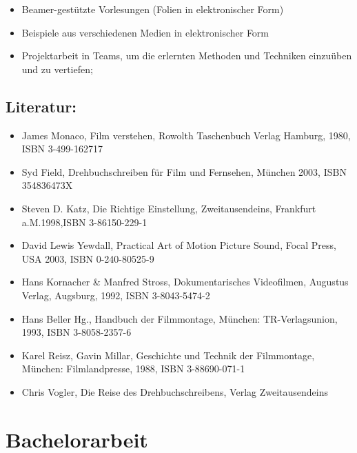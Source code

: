 \begin{itemize}
\item
  Beamer-gestützte Vorlesungen (Folien in elektronischer Form)
\item
  Beispiele aus verschiedenen Medien in elektronischer Form
\item
  Projektarbeit in Teams, um die erlernten Methoden und Techniken
  einzuüben und zu vertiefen;
\end{itemize}

\section*{Literatur:}\label{literatur-2}

\begin{itemize}
\item
  James Monaco, Film verstehen, Rowolth Taschenbuch Verlag Hamburg,
  1980, ISBN 3-499-162717
\item
  Syd Field, Drehbuchschreiben für Film und Fernsehen, München 2003,
  ISBN 354836473X
\item
  Steven D. Katz, Die Richtige Einstellung, Zweitausendeins, Frankfurt
  a.M.1998,ISBN 3-86150-229-1
\item
  David Lewis Yewdall, Practical Art of Motion Picture Sound, Focal
  Press, USA 2003, ISBN 0-240-80525-9
\item
  Hans Kornacher \& Manfred Stross, Dokumentarisches Videofilmen,
  Augustus Verlag, Augsburg, 1992, ISBN 3-8043-5474-2
\item
  Hans Beller Hg., Handbuch der Filmmontage, München: TR-Verlagsunion,
  1993, ISBN 3-8058-2357-6
\item
  Karel Reisz, Gavin Millar, Geschichte und Technik der Filmmontage,
  München: Filmlandpresse, 1988, ISBN 3-88690-071-1
\item
  Chris Vogler, Die Reise des Drehbuchschreibens, Verlag Zweitausendeins
\end{itemize}

\chapter{Bachelorarbeit}\label{bachelorarbeit}

